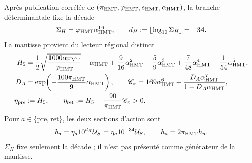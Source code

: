 \begin{theorem}
Après publication corrélée de
\((\pi_{\rm HMT},\varphi_{\rm HMT},e_{\rm HMT},\alpha_{\rm HMT})\), la branche
déterminantale fixe la décade
\begin{equation}
 \Sigma_H=\varphi_{\rm HMT}\alpha_{\rm HMT}^{16},\qquad
 d_H:=\lfloor\log_{10}\Sigma_H\rfloor=-34.
 \label{eq:frontal-decada-accion}
\end{equation}
La mantisse provient du lecteur régional distinct
\begin{align}
 H_5&=\frac12\sqrt{\frac{1000\alpha_{\rm HMT}}{\varphi_{\rm HMT}}}
 -\alpha_{\rm HMT}+\frac9{16}\alpha_{\rm HMT}^2
 -\frac59\alpha_{\rm HMT}^3+\frac7{48}\alpha_{\rm HMT}^4
 -\frac1{54}\alpha_{\rm HMT}^5,\notag\\
 D_A&=\exp\!\left(-\frac{100\pi_{\rm HMT}}9\alpha_{\rm HMT}\right),
 \qquad
 \mathscr C_\pi=169\alpha_{\rm HMT}^6+
 \frac{D_A\alpha_{\rm HMT}^7}{1-D_A\alpha_{\rm HMT}},\notag\\
 \eta_{\rm pre}&:=H_5,\qquad
 \eta_{\rm ret}:=H_5-\frac{90}{\pi_{\rm HMT}}\mathscr C_\pi>0.
 \label{eq:frontal-mantisas-accion}
\end{align}
Pour \(a\in\{\mathrm{pre},\mathrm{ret}\}\), les deux sections d'action sont
\begin{equation}
 \hbar_a=\eta_a10^{d_H}\mathcal U_S
 =\eta_a10^{-34}\mathcal U_S,\qquad
 h_a=2\pi_{\rm HMT}\hbar_a.
 \label{eq:frontal-secciones-accion}
\end{equation}
\(\Sigma_H\) fixe seulement la décade ; il n'est pas présenté comme générateur de la
mantisse.


\end{theorem}
